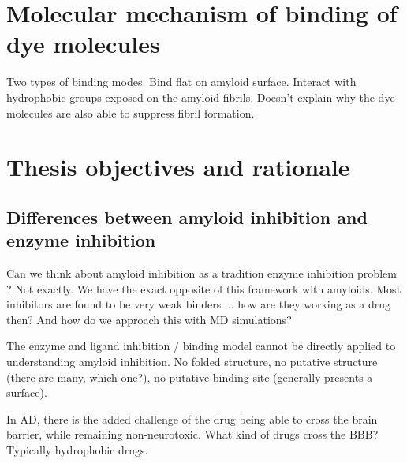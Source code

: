\section{Molecular mechanism of binding of dye molecules}
Two types of binding modes. Bind flat on amyloid surface. Interact with hydrophobic groups exposed on the amyloid fibrils.
Doesn't explain why the dye molecules are also able to suppress fibril formation.



\section{Thesis objectives and rationale}
\subsection{Differences between amyloid inhibition and enzyme inhibition}
\begin{outline}
    \1 Can we think about amyloid inhibition as a tradition enzyme inhibition problem ? Not exactly. We have the exact opposite of this framework with amyloids. Most inhibitors are found to be very weak binders ... how are they working as a drug then? And how do we approach this with MD simulations?

    \1 The enzyme and ligand inhibition / binding model cannot be directly applied to understanding amyloid inhibition.  No folded structure, no putative structure (there are many, which one?), no putative binding site (generally presents a surface).

    \1 In AD, there is the added challenge of the drug being able to cross the brain barrier, while remaining non-neurotoxic.  What kind of drugs cross the BBB?  Typically hydrophobic drugs.
\end{outline}    


